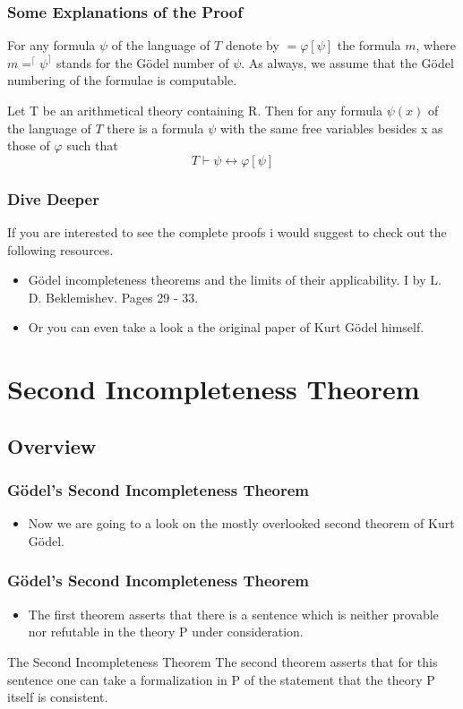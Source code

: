 \documentclass[aspectratio=169]{beamer}
\begin{document}
\begin{frame}
	\frametitle{Some Explanations of the Proof}
	For any formula $\psi$ of the language of $T$ denote by $=\varphi \left[\psi \right]$ the formula \underline{$m$}, where $m = ^{\lceil} \psi ^{\rceil}$ stands for the Gödel number of $\psi$. As always, we assume that the Gödel numbering of the formulae is computable.
	
	\begin{lemma}
		Let T be an arithmetical theory containing R. Then for any formula $\psi(x)$ of the language of $T$ there is a formula $\psi$ with the same free variables besides x as those of $\varphi$ such that
			\[T \vdash \psi \leftrightarrow \varphi[\psi]\]
	\end{lemma}
	\begin{flushright}
		\cite{bekl}
	\end{flushright}
\end{frame}

\begin{frame}
	\frametitle{Dive Deeper}
	If you are interested to see the complete proofs i would suggest to check out the following resources.
	\begin{itemize}
		\item Gödel incompleteness theorems and the limits of their applicability. I by L. D. Beklemishev. Pages 29 - 33. \cite{bekl}
		\item Or you can even take a look a the original paper of Kurt Gödel himself. \cite{godel}  
	\end{itemize}
\end{frame}

\section{Second Incompleteness Theorem}
\subsection{Overview}
\begin{frame}
	\frametitle{Gödel's Second Incompleteness Theorem}
	\begin{itemize}
		\item Now we are going to a look on the mostly overlooked second theorem of Kurt Gödel.
	\end{itemize}
\end{frame}

\begin{frame}
	\frametitle{Gödel's Second Incompleteness Theorem}
	\begin{itemize}
		\item The first theorem asserts that there is a sentence which is neither provable nor refutable in the theory P under consideration.
	\end{itemize}
	\begin{block}{The Second Incompleteness Theorem}
		The second theorem asserts that for this sentence one can take a formalization in P of the statement that the theory P itself is consistent.
	\end{block}

\end{frame}
\end{document}
